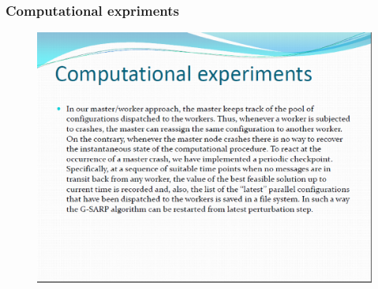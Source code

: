 \documentclass{beamer}
\begin{document}
\begin{frame}
\frametitle{Computational expriments }
\begin{figure}[!th]
\begin{center}
\includegraphics[width=1\textwidth]{img/pic12.eps}
\end{center}
\end{figure}
\end{frame}
\end{document}
